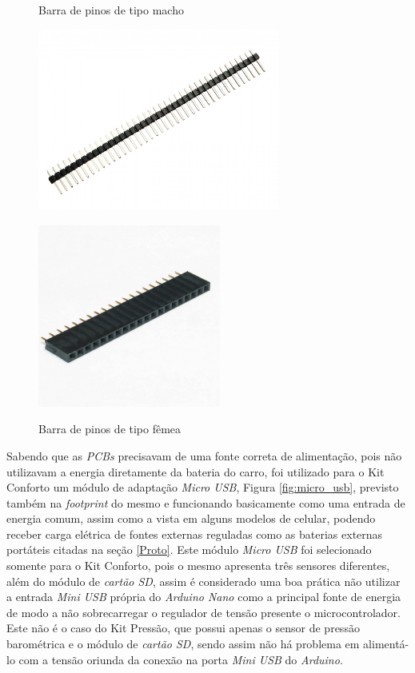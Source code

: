 \documentclass[acronym,symbols,table]{fei}
\begin{document}
\begin{figure}[!htb]
    \centering
    \begin{minipage}{0.45\textwidth}
        \caption{Barra de pinos de tipo macho}
        \includegraphics[width=\linewidth, height=6cm]{Imagens/barramacho.jpg}
        \label{fig:barramacho}
    \end{minipage}\hfill
    \begin{minipage}{0.45\textwidth}
        \caption{Barra de pinos de tipo fêmea}
        \includegraphics[width=\linewidth, height=6cm]{Imagens/barrafemea.jpg}
        \label{fig:barrafemea}
    \end{minipage}
\end{figure}

Sabendo que as \textit{PCBs} precisavam de uma fonte correta de alimentação, pois não utilizavam a energia diretamente da bateria do carro, foi utilizado para o Kit Conforto um módulo de adaptação \textit{Micro USB}, Figura \ref{fig:micro_usb}, previsto também na \textit{footprint} do mesmo e funcionando basicamente como uma entrada de energia comum, assim como a vista em alguns modelos de celular, podendo receber carga elétrica de fontes externas reguladas como as baterias externas portáteis citadas na seção \ref{Proto}. Este módulo \textit{Micro USB} foi selecionado somente para o Kit Conforto, pois o mesmo apresenta três sensores diferentes, além do módulo de \textit{cartão SD}, assim é considerado uma boa prática não utilizar a entrada \textit{Mini USB} própria do \textit{Arduino Nano} como a principal fonte de energia de modo a não sobrecarregar o regulador de tensão presente o microcontrolador. Este não é o caso do Kit Pressão, que possui apenas o sensor de pressão barométrica e o módulo de \textit{cartão SD}, sendo assim não há problema em alimentá-lo com a tensão oriunda da conexão na porta \textit{Mini USB} do \textit{Arduino}.
\end{document}
